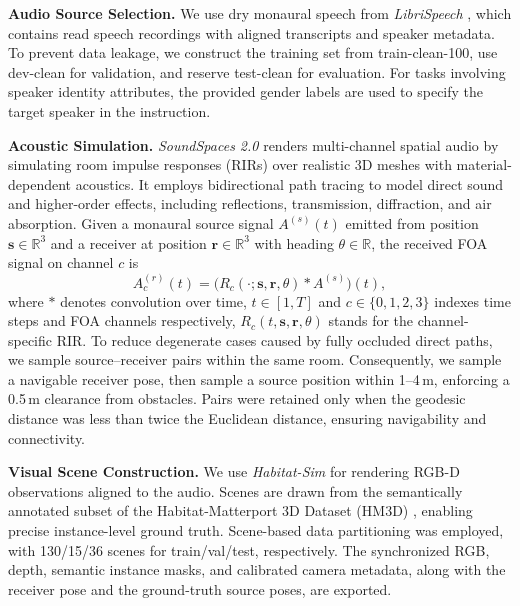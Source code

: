 \textbf{Audio Source Selection.}
We use dry monaural speech from \textit{LibriSpeech} \citep{panayotov2015librispeech}, which contains read speech recordings with aligned transcripts and speaker metadata. To prevent data leakage, we construct the training set from train-clean-100, use dev-clean for validation, and reserve test-clean for evaluation. For tasks involving speaker identity attributes, the provided gender labels are used to specify the target speaker in the instruction.

\textbf{Acoustic Simulation.} \textit{SoundSpaces 2.0} renders multi-channel spatial audio by simulating room impulse responses (RIRs) over realistic 3D meshes with material-dependent acoustics. 
It employs bidirectional path tracing \citep{cao2016interactive} to model direct sound and higher-order effects, including reflections, transmission, diffraction, and air absorption. 
Given a monaural source signal $A^{(s)}(t)$ emitted from position $\mathbf{s}\in\mathbb{R}^3$ and a receiver at position $\mathbf{r}\in\mathbb{R}^3$ with heading $\theta\in\mathbb{R}$, the received FOA signal on channel $c$ is
\begin{equation}
    A^{(r)}_c(t) = \bigl(R_c(\cdot;\mathbf{s},\mathbf{r},\theta)\ast A^{(s)}\bigr)(t),
\end{equation}
where $\ast$ denotes convolution over time, $t \in [1, T]$ and $c \in \{0, 1, 2, 3\}$ indexes time steps and FOA channels respectively, $R_c(t, \mathbf{s}, \mathbf{r}, \theta)$ stands for the channel-specific RIR.
To reduce degenerate cases caused by fully occluded direct paths, we sample source--receiver pairs within the same room. 
Consequently, we sample a navigable receiver pose, then sample a source position within 1--4\,m, enforcing a 0.5\,m clearance from obstacles. 
Pairs were retained only when the geodesic distance was less than twice the Euclidean distance, ensuring navigability and connectivity.

\textbf{Visual Scene Construction.} We use \textit{Habitat-Sim} \citep{szot2021habitat} for rendering RGB-D observations aligned to the audio. Scenes are drawn from the semantically annotated subset of the Habitat-Matterport 3D Dataset (HM3D) \citep{ramakrishnan2021habitat}, enabling precise instance-level ground truth. Scene-based data partitioning was employed, with 130/15/36 scenes for train/val/test, respectively. The synchronized RGB, depth, semantic instance masks, and calibrated camera metadata, along with the receiver pose and the ground-truth source poses, are exported.

